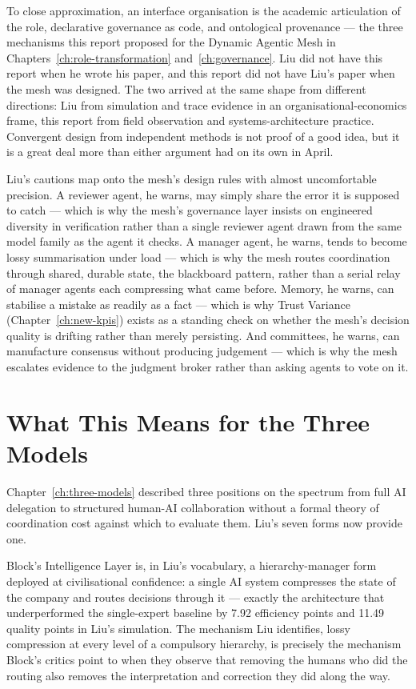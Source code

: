 \begin{keyinsight}[title={An Independent Convergence}]
To close approximation, an interface organisation is the academic articulation of the  role, declarative governance as code, and ontological provenance --- the three mechanisms this report proposed for the Dynamic Agentic Mesh in Chapters~\ref{ch:role-transformation} and~\ref{ch:governance}. Liu did not have this report when he wrote his paper, and this report did not have Liu's paper when the mesh was designed. The two arrived at the same shape from different directions: Liu from simulation and trace evidence in an organisational-economics frame, this report from field observation and systems-architecture practice. Convergent design from independent methods is not proof of a good idea, but it is a great deal more than either argument had on its own in April.
\end{keyinsight}

Liu's cautions map onto the mesh's design rules with almost uncomfortable precision. A reviewer agent, he warns, may simply share the error it is supposed to catch --- which is why the mesh's governance layer insists on engineered diversity in verification rather than a single reviewer agent drawn from the same model family as the agent it checks. A manager agent, he warns, tends to become lossy summarisation under load --- which is why the mesh routes coordination through shared, durable state, the blackboard pattern, rather than a serial relay of manager agents each compressing what came before. Memory, he warns, can stabilise a mistake as readily as a fact --- which is why Trust Variance (Chapter~\ref{ch:new-kpis}) exists as a standing check on whether the mesh's decision quality is drifting rather than merely persisting. And committees, he warns, can manufacture consensus without producing judgement --- which is why the mesh escalates evidence to the judgment broker rather than asking agents to vote on it.

\section{What This Means for the Three Models}

Chapter~\ref{ch:three-models} described three positions on the spectrum from full AI delegation to structured human-AI collaboration without a formal theory of coordination cost against which to evaluate them. Liu's seven forms now provide one.

Block's Intelligence Layer is, in Liu's vocabulary, a hierarchy-manager form deployed at civilisational confidence: a single AI system compresses the state of the company and routes decisions through it --- exactly the architecture that underperformed the single-expert baseline by 7.92 efficiency points and 11.49 quality points in Liu's simulation. The mechanism Liu identifies, lossy compression at every level of a compulsory hierarchy, is precisely the mechanism Block's critics point to when they observe that removing the humans who did the routing also removes the interpretation and correction they did along the way.

